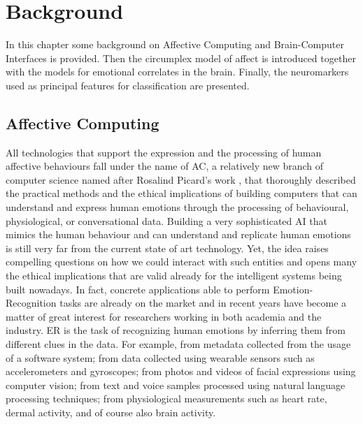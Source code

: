 \chapter{Background}
\label{chap:background}
In this chapter some background on Affective Computing and Brain-Computer Interfaces is provided. Then the circumplex model of affect is introduced together with the models for emotional correlates in the brain. Finally, the neuromarkers used as principal features for classification are presented.

\section{Affective Computing}
\label{sec:affective_computing}
All technologies that support the expression and the processing of human affective behaviours fall under the name of \ac{AC}, a relatively new branch of computer science named after Rosalind Picard’s work \cite{picard_mit_nodate}, that thoroughly described the practical methods and the ethical implications of building computers that can understand and express human emotions through the processing of behavioural, physiological, or conversational data. Building a very sophisticated \ac{AI} that mimics the human behaviour and can understand and replicate human emotions is still very far from the current state of art technology. Yet, the idea raises compelling questions on how we could interact with such entities and opens many the ethical implications that are valid already for the intelligent systems being built nowadays. In fact, concrete applications able to perform Emotion-Recognition tasks are already on the market and in recent years have become a matter of great interest for researchers working in both academia and the industry. \ac{ER} is the task of recognizing human emotions by inferring them from different clues in the data. For example, from metadata collected from the usage of a software system; from data collected using wearable sensors such as accelerometers and gyroscopes; from photos and videos of facial expressions using computer vision; from text and voice samples processed using natural language processing techniques; from physiological measurements such as heart rate, dermal activity, and of course also brain activity.

